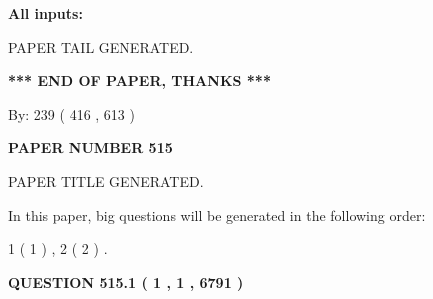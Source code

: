 \documentclass{ctexart}
\begin{document}
   
   
   
\noindent{}
   
   
   
   
\noindent\vspace{0.1in}\hspace{-0.08in} {\textbf{\Large{All inputs: }}}
   
   
   
   
   
   
 \vspace{0.2in}
 
   
   
\vspace{2.0in} PAPER TAIL GENERATED.
   
   
   
   
\vspace{1.0in} 
{\textbf{\large{ *** END OF PAPER, THANKS *** }}} 
   
   
\hspace{1.0in} By: 
 239 ( 416 ,  613 )
   
   
   
   
\newpage 
\setcounter{page}{ 
   515001 } 
   
   
   
   
 {\textbf{ \Large{ PAPER NUMBER  515  }}}
   
   
\vspace{0.2in}
   
   
   
   
   
   
   
   
 \vspace{0.2in}
 
 
 
 
   
   
 PAPER TITLE GENERATED.
   
   
   
\vspace{0.2in}
   
In this paper, big questions will be generated in the following order: 
   
   
   1 ( 1 )
 ,
   2 ( 2 )
 .
  
\vspace{0.2in}
  
{\textbf{\Large{QUESTION
515.1 
 ( 1 , 1 , 6791 )
}}}
  
\end{document}
